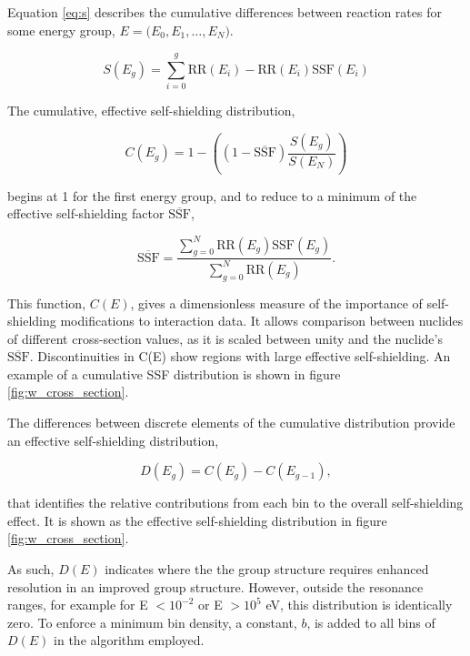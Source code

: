 Equation \ref{eq:s} describes the cumulative differences between reaction rates for some energy group, ${E = (E_{0}, E_{1}, \dots, E_{N}})$. 

\begin{equation}
\label{eq:s}
S(E_{g}) = \sum_{i=0}^{g} \mathrm{RR}(E_{i}) - \mathrm{RR}(E_{i})\mathrm{SSF}(E_{i})
\end{equation}

The cumulative, effective self-shielding distribution,

\begin{equation}
\label{eq:c}
C(E_{g}) = 1 - \left( \left(1-\overline{\mathrm{SSF}}\right) \frac{S(E_{g})} {S(E_{N})}\right)
\end{equation}

begins at 1 for the first energy group, and to reduce to a minimum of the effective self-shielding factor $\overline{\mathrm{SSF}}$,

\begin{equation}
\label{eq:ssf_bar}
\overline{\mathrm{SSF}} = \frac{\sum_{g=0}^{N}\mathrm{RR}(E_{g})\mathrm{SSF}(E_{g})}
{\sum_{g=0}^{N}\mathrm{RR}(E_{g})}.
\end{equation}

This function, $C(E)$, gives a dimensionless measure of the importance of self-shielding modifications to interaction data. It allows comparison between nuclides of different cross-section values, as it is scaled between unity and the nuclide's $\overline{\mathrm{SSF}}$. Discontinuities in C(E) show regions with large effective self-shielding. An example of a cumulative SSF distribution is shown in figure \ref{fig:w_cross_section}. 

The differences between discrete elements of the cumulative distribution provide an effective self-shielding distribution,

\begin{equation}
\label{eq:d}
D(E_{g}) = C(E_{g}) - C(E_{g-1}),
\end{equation}

that identifies the relative contributions from each bin to the overall self-shielding effect. It is shown as the effective self-shielding distribution in figure \ref{fig:w_cross_section}.

As such, $D(E)$ indicates where the the group structure requires enhanced resolution in an improved group structure. However, outside the resonance ranges, for example for E $< 10^{-2}$ or E $> 10^{5}$ eV, this distribution is identically zero. To enforce a minimum bin density, a constant, $b$, is added to all bins of $D(E)$ in the algorithm employed. 

